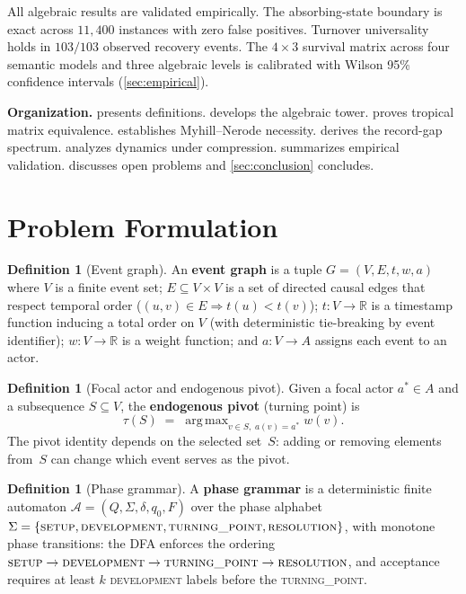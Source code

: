 \documentclass[11pt]{article}
\theoremstyle{plain}
\theoremstyle{definition}
\newtheorem{definition}[theorem]{Definition}
\theoremstyle{remark}
\newcommand{\R}{\mathbb{R}}
\DeclareMathOperator*{\argmax}{arg\,max}
\begin{document}
\medskip
All algebraic results are validated empirically.  The absorbing-state
boundary is exact across $11{,}400$ instances with zero false positives.
Turnover universality holds in $103/103$ observed recovery events.  The
$4 \times 3$ survival matrix across four semantic models and three
algebraic levels is calibrated with Wilson 95\% confidence intervals
(\cref{sec:empirical}).

\medskip
\noindent\textbf{Organization.}   presents
definitions.   develops the algebraic tower.
 proves tropical matrix equivalence.
 establishes Myhill--Nerode necessity.
 derives the record-gap spectrum.
 analyzes dynamics under compression.
 summarizes empirical validation.
 discusses open problems and
\cref{sec:conclusion} concludes.

\section{Problem Formulation}\label{sec:formulation}

\begin{definition}[Event graph]\label{def:event-graph}
An \textbf{event graph} is a tuple $G = (V, E, t, w, a)$ where $V$ is a
finite event set; $E \subseteq V \times V$ is a set of directed causal
edges that respect temporal order ($(u,v) \in E \Rightarrow t(u) <
t(v)$); $t \colon V \to \R$ is a timestamp function inducing a total
order on $V$ (with deterministic tie-breaking by event identifier);
$w \colon V \to \R$ is a weight function; and $a \colon V \to A$
assigns each event to an actor.
\end{definition}

\begin{definition}[Focal actor and endogenous pivot]\label{def:pivot}
Given a focal actor $a^* \in A$ and a subsequence $S \subseteq V$, the
\textbf{endogenous pivot} (turning point) is
\[
  \tau(S) \;=\; \argmax_{v \in S,\; a(v) = a^*} w(v).
\]
The pivot identity depends on the selected set~$S$: adding or removing
elements from~$S$ can change which event serves as the pivot.
\end{definition}

\begin{definition}[Phase grammar]\label{def:grammar}
A \textbf{phase grammar} is a deterministic finite automaton
$\mathcal{A} = (Q, \Sigma, \delta, q_0, F)$ over the phase alphabet
$\Sigma = \{\textsc{setup}, \textsc{development}, \textsc{turning\_point},
\textsc{resolution}\}$, with monotone phase transitions: the DFA
enforces the ordering
$\textsc{setup} \to \textsc{development} \to \textsc{turning\_point}
\to \textsc{resolution}$, and acceptance requires at least $k$
\textsc{development} labels before the \textsc{turning\_point}.
\end{definition}
\end{document}
